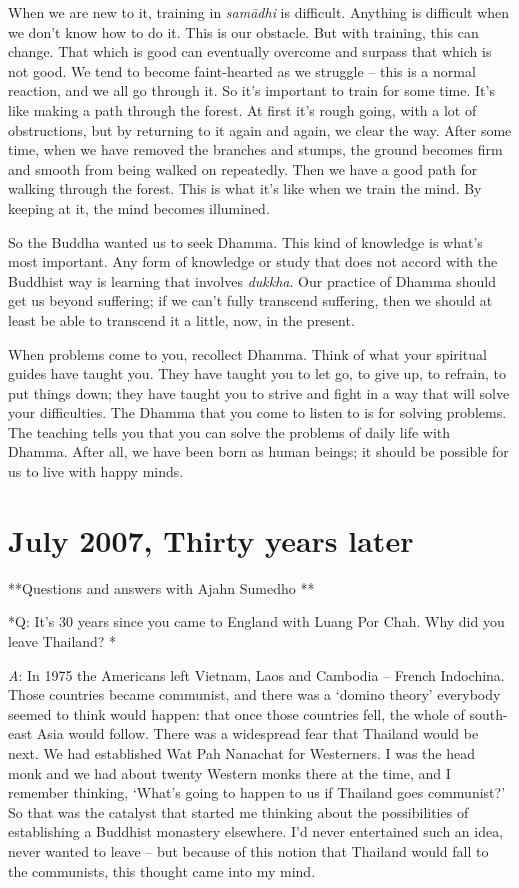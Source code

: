 When we are new to it, training in \emph{samādhi} is difficult. Anything
is difficult when we don't know how to do it. This is our obstacle. But
with training, this can change. That which is good can eventually
overcome and surpass that which is not good. We tend to become
faint-hearted as we struggle -- this is a normal reaction, and we all go
through it. So it's important to train for some time. It's like making a
path through the forest. At first it's rough going, with a lot of
obstructions, but by returning to it again and again, we clear the way. 
After some time, when we have removed the branches and stumps, the
ground becomes firm and smooth from being walked on repeatedly. Then we
have a good path for walking through the forest. This is what it's like
when we train the mind. By keeping at it, the mind becomes illumined. 

So the Buddha wanted us to seek Dhamma. This kind of knowledge is what's
most important. Any form of knowledge or study that does not accord with
the Buddhist way is learning that involves \emph{dukkha}. Our practice
of Dhamma should get us beyond suffering; if we can't fully transcend
suffering, then we should at least be able to transcend it a little, 
now, in the present. 

When problems come to you, recollect Dhamma. Think of what your
spiritual guides have taught you. They have taught you to let go, to
give up, to refrain, to put things down; they have taught you to strive
and fight in a way that will solve your difficulties. The Dhamma that
you come to listen to is for solving problems. The teaching tells you
that you can solve the problems of daily life with Dhamma. After all, we
have been born as human beings; it should be possible for us to live
with happy minds. 

\chapter{July 2007, Thirty years later}

**Questions and answers with Ajahn Sumedho **

*Q: It's 30 years since you came to England with Luang Por Chah. Why did
you leave Thailand? *

\emph{A}: In 1975 the Americans left Vietnam, Laos and Cambodia --
French Indochina. Those countries became communist, and there was a
`domino theory' everybody seemed to think would happen: that once those
countries fell, the whole of south-east Asia would follow. There was a
widespread fear that Thailand would be next. We had established Wat Pah
Nanachat for Westerners. I was the head monk and we had about twenty
Western monks there at the time, and I remember thinking, `What's going
to happen to us if Thailand goes communist?' So that was the catalyst
that started me thinking about the possibilities of establishing a
Buddhist monastery elsewhere. I'd never entertained such an idea, never
wanted to leave -- but because of this notion that Thailand would fall
to the communists, this thought came into my mind. 

